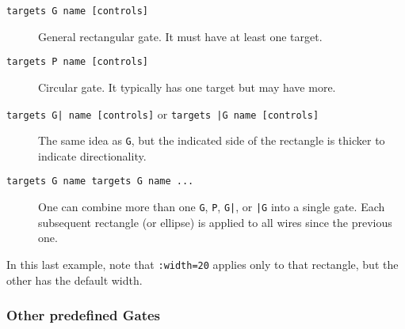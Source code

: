 \documentclass[twoside,12pt]{article}
\begin{document}
\begin{description}
\item[{\tt targets G name [controls]}] General rectangular gate.  It must have at
least one target.

\begin{minipage}[b]{2in}

\end{minipage} \hfill 

\item[{\tt targets P name [controls]}] Circular gate.  It typically has one target but may have more.

\begin{minipage}[b]{2in}

\end{minipage} \hfill 

\item[{\tt targets G| name [controls]} or {\tt targets |G name [controls]}] The same idea as {\tt G}, but the indicated
side of the rectangle is thicker to indicate directionality.

\begin{minipage}[b]{2in}

\end{minipage} \hfill 

\item[{\tt targets G name targets G name ...}] One can combine more than
  one {\tt G}, {\tt P}, {\tt G|}, or {\tt |G} into a single gate.
  Each subsequent rectangle (or ellipse) is applied to all wires since the
previous one.

\begin{minipage}[b]{3in}

\end{minipage} \hfill 
\end{description}

In this last example, note that {\tt :width=20} applies only to that
rectangle, but the other has the default width.

\subsubsection{Other predefined Gates}
\end{document}
